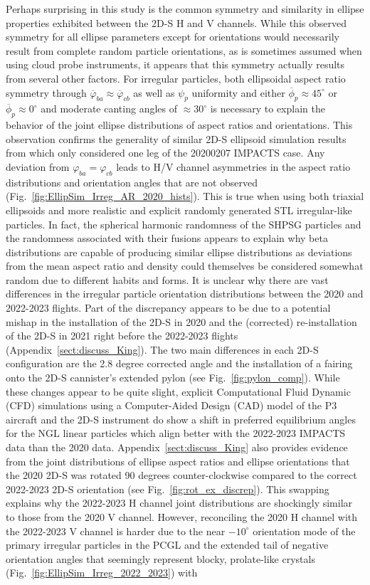 \documentclass[amt, manuscript]{copernicus}
\begin{document}
Perhaps surprising in this study is the common symmetry and similarity in ellipse properties exhibited between the 2D-S H and V channels. While this observed symmetry for all ellipse parameters except for orientations would necessarily result from complete random particle orientations, as is sometimes assumed when using cloud probe instruments, it appears that this symmetry actually results from several other factors. For irregular particles, both ellipsoidal aspect ratio symmetry through $\overline{\varphi}_{ba} \approx \overline{\varphi}_{cb}$ as well as $\psi_{p}$ uniformity and either $\overline{\phi}_{p} \approx 45^{\circ}$ or $\overline{\phi}_{p} \approx 0^{\circ}$ and moderate canting angles of $\approx 30^{\circ}$ is necessary to explain the behavior of the joint ellipse distributions of aspect ratios and orientations. This observation confirms the generality of similar 2D-S ellipsoid simulation results from \citet{Dunnavan2022} which only considered one leg of the 20200207 IMPACTS case. Any deviation from $\varphi_{ba}=\varphi_{cb}$ leads to H/V channel asymmetries in the aspect ratio distributions and orientation angles that are not observed (Fig.~\ref{fig:EllipSim_Irreg_AR_2020_hists}). This is true when using both triaxial ellipsoids and more realistic and explicit randomly generated STL irregular-like particles. In fact, the spherical harmonic randomness of the SHPSG particles and the randomness associated with their fusions appears to explain why beta distributions are capable of producing similar ellipse distributions as deviations from the mean aspect ratio and density could themselves be considered somewhat random due to different habits and forms. It is unclear why there are vast differences in the irregular particle orientation distributions between the 2020 and 2022-2023 flights. Part of the discrepancy appears to be due to a potential mishap in the installation of the 2D-S in 2020 and the (corrected) re-installation of the 2D-S in 2021 right before the 2022-2023 flights (Appendix~\ref{sect:discuss_King}). The two main differences in each 2D-S configuration are the 2.8 degree corrected angle and the installation of a fairing onto the 2D-S cannister's extended pylon (see Fig.~\ref{fig:pylon_comp}). While these changes appear to be quite slight, explicit Computational Fluid Dynamic (CFD) simulations using a Computer-Aided Design (CAD) model of the P3 aircraft and the 2D-S instrument do show a shift in preferred equilibrium angles for the NGL linear particles which align better with the 2022-2023 IMPACTS data than the 2020 data. Appendix~\ref{sect:discuss_King} also provides evidence from the joint distributions of ellipse aspect ratios and ellipse orientations that the 2020 2D-S was rotated 90 degrees counter-clockwise compared to the correct 2022-2023 2D-S orientation (see Fig.~\ref{fig:rot_ex_discrep}). This swapping explains why the 2022-2023 H channel joint distributions are shockingly similar to those from the 2020 V channel. However, reconciling the 2020 H channel with the 2022-2023 V channel is harder due to the near $-10^{\circ}$ orientation mode of the primary irregular particles in the PCGL and the extended tail of negative orientation angles that seemingly represent blocky, prolate-like crystals (Fig.~\ref{fig:EllipSim_Irreg_2022_2023}) with 
\end{document}
